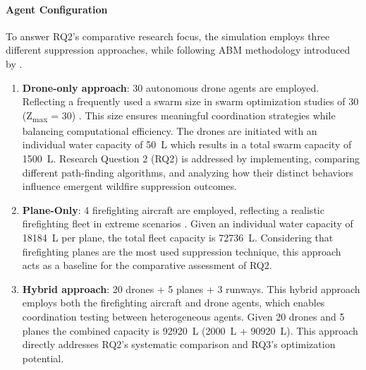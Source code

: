 \documentclass[11pt, a4paper]{article}
\begin{document}
\paragraph{Agent Configuration} To answer RQ2's comparative research focus, the simulation employs three different suppression approaches, while following ABM methodology introduced by \citet*{wilensky2015introduction}.
\begin{enumerate}
  \item \textbf{Drone-only approach}: 30 autonomous drone agents are employed. Reflecting a frequently used a swarm size in swarm optimization studies of 30 (Z\textsubscript{max} = 30) \citep{swarm1_kozlov2022information,swarm2_optimization_drone}. This size ensures meaningful coordination strategies while balancing computational efficiency. The drones are initiated with an individual water capacity of \SI{50}{\liter} which results in a total swarm capacity of \SI{1500}{\liter}. Research Question 2 (RQ2) is addressed by implementing, comparing different path-finding algorithms, and analyzing how their distinct behaviors influence emergent wildfire suppression outcomes.
  \item \textbf{Plane-Only}: 4 firefighting aircraft are employed, reflecting a realistic firefighting fleet in extreme scenarios \citep{sherryAerialFireFighting2025}. Given an individual water capacity of \SI{18184}{\liter} per plane, the total fleet capacity is \SI{72736}{\liter}. Considering that firefighting planes are the most used suppression technique, this approach acts as a baseline for the comparative assessment of RQ2.
  \item \textbf{Hybrid approach}: 20 drones + 5 planes + 3 runways. This hybrid approach employs both the firefighting aircraft and drone agents, which enables coordination testing between heterogeneous agents. Given 20 drones and 5 planes the combined capacity is \SI{92920}{\liter} (\SI{2000}{\liter} + \SI{90920}{\liter}). This approach directly addresses RQ2's systematic comparison and RQ3's optimization potential. 
\end{enumerate}
\end{document}
